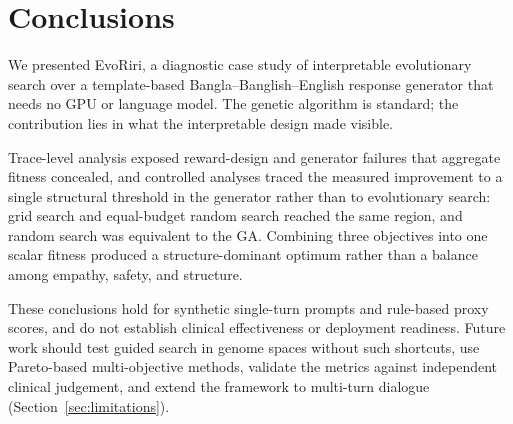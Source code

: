 \documentclass[mathematics,article,submit,xetex,moreauthors]{Definitions/mdpi}
\begin{document}
\section{Conclusions}
\label{sec:conclusion}

We presented EvoRiri, a diagnostic case study of interpretable evolutionary
search over a template-based Bangla--Banglish--English response generator that
needs no GPU or language model. The genetic algorithm is standard; the
contribution lies in what the interpretable design made visible.

Trace-level analysis exposed reward-design and generator failures that aggregate
fitness concealed, and controlled analyses traced the measured improvement to a
single structural threshold in the generator rather than to evolutionary search:
grid search and equal-budget random search reached the same region, and random
search was equivalent to the GA. Combining three objectives into one scalar
fitness produced a structure-dominant optimum rather than a balance among
empathy, safety, and structure.

These conclusions hold for synthetic single-turn prompts and rule-based proxy
scores, and do not establish clinical effectiveness or deployment readiness.
Future work should test guided search in genome spaces without such shortcuts,
use Pareto-based multi-objective methods, validate the metrics against
independent clinical judgement, and extend the framework to multi-turn dialogue
(Section~\ref{sec:limitations}).



\end{document}
